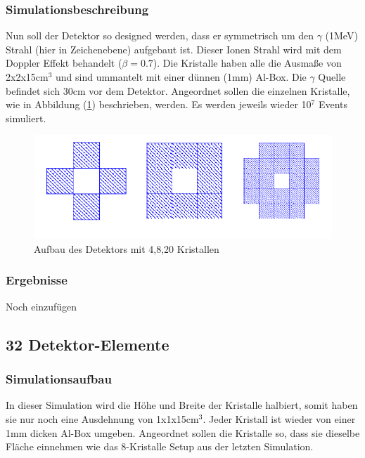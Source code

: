 \documentclass[a4paper,14pt,twoside]{article}
\begin{document}
		\subsubsection{Simulationsbeschreibung}
			Nun soll der Detektor so designed werden, dass er symmetrisch um den $\gamma$ (1MeV) Strahl (hier in Zeichenebene) aufgebaut ist. Dieser Ionen Strahl wird mit dem Doppler Effekt behandelt ($\beta=0.7$). Die Kristalle haben alle die Ausmaße von 2x2x15cm$^3$ und sind ummantelt mit einer dünnen (1mm) Al-Box. Die $\gamma$ Quelle befindet sich 30cm vor dem Detektor. Angeordnet sollen die einzelnen Kristalle, wie in Abbildung (\ref{fig:Aufbau}) beschrieben, werden. Es werden jeweils wieder 10$^7$ Events simuliert. 
			
			\begin{figure}[H]
				\begin{center}
				\includegraphics[width=0.7\linewidth]{Aufbau}
				\caption{Aufbau des Detektors mit 4,8,20 Kristallen}
				\label{fig:Aufbau}
				\end{center}
			\end{figure}


		\subsubsection{Ergebnisse}
			{\color{Red} Noch einzufügen}
			
			
			
			
			
			
	\subsection{32 Detektor-Elemente}
		\subsubsection{Simulationsaufbau}
			In dieser Simulation wird die Höhe und Breite der Kristalle halbiert, somit haben sie nur noch eine Ausdehnung von 1x1x15cm$^3$. Jeder Kristall ist wieder von einer 1mm dicken Al-Box umgeben. Angeordnet sollen die Kristalle so, dass sie dieselbe Fläche einnehmen wie das 8-Kristalle Setup aus der letzten Simulation. 
			
\end{document}
